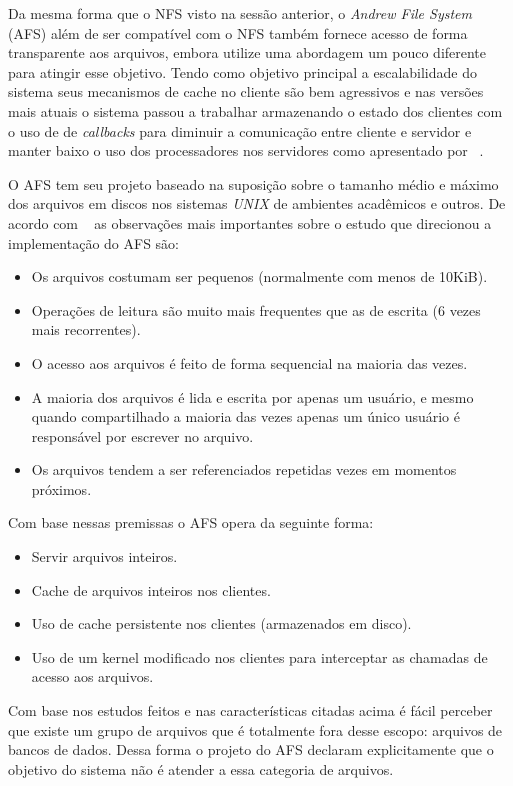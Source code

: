     Da mesma forma que o NFS visto na sessão anterior, o \textit{Andrew File System} (AFS) além de ser compatível com o NFS também fornece acesso de forma transparente aos arquivos, embora utilize uma abordagem um pouco diferente para atingir esse objetivo. Tendo como objetivo principal a escalabilidade do sistema seus mecanismos de cache no cliente são bem agressivos e nas versões mais atuais o sistema passou a trabalhar armazenando o estado dos clientes com o uso de de \textit{callbacks} para diminuir a comunicação entre cliente e servidor e manter baixo o uso dos processadores nos servidores como apresentado por ~\cite{coulouris}.
    
    O AFS tem seu projeto baseado na suposição sobre o tamanho médio e máximo dos arquivos em discos nos sistemas \textit{UNIX} de ambientes acadêmicos e outros. De acordo com ~\cite{coulouris} as observações mais importantes sobre o estudo que direcionou a implementação do AFS são:
    \begin{itemize}
        \item Os arquivos costumam ser pequenos (normalmente com menos de 10KiB).
        \item Operações de leitura são muito mais frequentes que as de escrita (6 vezes mais recorrentes).
        \item O acesso aos arquivos é feito de forma sequencial na maioria das vezes.
        \item A maioria dos arquivos é lida e escrita por apenas um usuário, e mesmo quando compartilhado a maioria das vezes apenas um único usuário é responsável por escrever no arquivo.
        \item Os arquivos tendem a ser referenciados repetidas vezes em momentos próximos.
    \end{itemize}
    
    Com base nessas premissas o AFS opera da seguinte forma:
    \begin{itemize}
        \item Servir arquivos inteiros.
        \item Cache de arquivos inteiros nos clientes.
        \item Uso de cache persistente nos clientes (armazenados em disco).
        \item Uso de um kernel modificado nos clientes para interceptar as chamadas de acesso aos arquivos.
    \end{itemize}
    
    Com base nos estudos feitos e nas características citadas acima é fácil perceber que existe um grupo de arquivos que é totalmente fora desse escopo: arquivos de bancos de dados. Dessa forma o projeto do AFS declaram explicitamente que o objetivo do sistema não é atender a essa categoria de arquivos.
    
